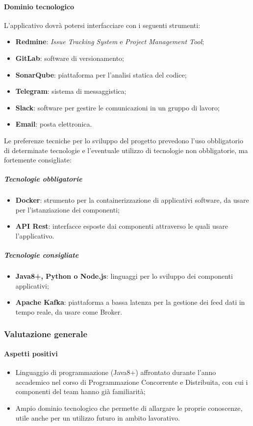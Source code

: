 {	\paragraph{Dominio tecnologico} \Spazio
	L'applicativo dovrà potersi interfacciare con i seguenti strumenti:
	\begin{itemize}
		\item  \textbf{Redmine}: \emph{Issue Tracking System} e \emph{Project Management Tool};
		\item  \textbf{GitLab}: software di versionamento;
		\item  \textbf{SonarQube}: piattaforma per l'analisi statica del codice;
		\item  \textbf{Telegram}: sistema di messaggistica;
		\item  \textbf{Slack}: software per gestire le comunicazioni in un gruppo di lavoro;
		\item  \textbf{Email}: posta elettronica.
		
	\end{itemize}
	
	Le preferenze tecniche per lo sviluppo del progetto prevedono l'uso obbligatorio di determinate tecnologie e l'eventuale utilizzo di tecnologie non obbligatorie, ma fortemente consigliate:
	\subparagraph{Tecnologie obbligatorie}
	\begin{itemize}
		\item  \textbf{Docker}: strumento per la containerizzazione di applicativi software, da usare per l'istanziazione dei componenti;
		\item  \textbf{API Rest}: interfacce esposte dai componenti attraverso le quali usare l'applicativo.
	\end{itemize}
	\subparagraph{Tecnologie consigliate}
	\begin{itemize}
		\item \textbf{Java8+, Python o Node.js}: linguaggi per lo sviluppo dei componenti applicativi;  
		\item  \textbf{Apache Kafka}: piattaforma a bassa latenza per la gestione dei feed dati in tempo reale, da usare come Broker.
	\end{itemize}
	\subsubsection{Valutazione generale}
	\paragraph{Aspetti positivi} 
	\begin{itemize}
		\item {Linguaggio di programmazione (Java8+) affrontato durante l'anno accademico nel corso di Programmazione Concorrente e Distribuita, con cui i componenti del team hanno già familiarità;}
		\item{Ampio dominio tecnologico che permette di allargare le proprie conoscenze, utile anche per un utilizzo futuro in ambito lavorativo.}
	\end{itemize}
}
